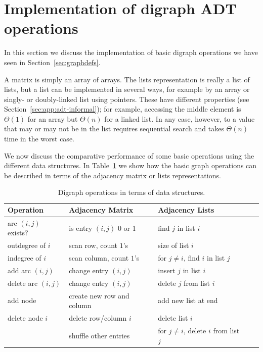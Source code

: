 \section{Implementation of digraph ADT operations}
\label{sec:graphadtimpl}

In this section we discuss the implementation of basic digraph operations 
we have seen in Section~\ref{sec:graphdefs}.

A matrix is simply an array of arrays. The lists representation is really
a list of lists, but a list can be implemented in several ways, for
example by an array or singly- or doubly-linked list using pointers. These
have different properties (see Section~\ref{sec:app:adt-informal}); for
example, accessing the middle element is $\Theta(1)$ for an array but
$\Theta(n)$ for a linked list. In any case, however, to 
a value that may or may not be in the list requires sequential search
and takes $\Theta(n)$ time in the worst case.

We now discuss the comparative performance of some basic operations
using the  different data structures. In Table~\ref{table:graphadt}
we show how the basic graph operations can be described in terms of the
adjacency matrix or lists representations.

\begin{table}
\caption{Digraph operations in terms of data structures.}
\label{table:graphadt}

\begin{center}
\begin{tabular}{|l|l|l|l|l|}
\hline

\textbf{Operation} & \textbf{Adjacency Matrix} & \textbf{Adjacency Lists} \\
\hline

arc $(i, j)$ exists? & is entry $(i,j)$ 0 or 1  & find $j$ in  list $i$ \\
\hline
outdegree  of $i$ & scan row, count $1$'s & size of  list  $i$\\
\hline
indegree of $i$ & scan column,  count $1$'s & for $j\neq i$, find $i$ in list $j$ \\
\hline
add arc $(i, j)$ & change entry $(i ,j)$ & insert $j$ in list $i$ \\
\hline
delete arc $(i, j)$ & change entry $(i ,j)$ & delete $j$ from list $i$ \\
\hline
add node & create new row and column & add new list at end\\
\hline
delete node $i$ & delete row/column $i$  & delete list $i$ \\
& shuffle other entries & for $j\neq i$, delete  $i$ from list $j$ \\ 
\hline

\end{tabular}
\end{center}
\end{table}

